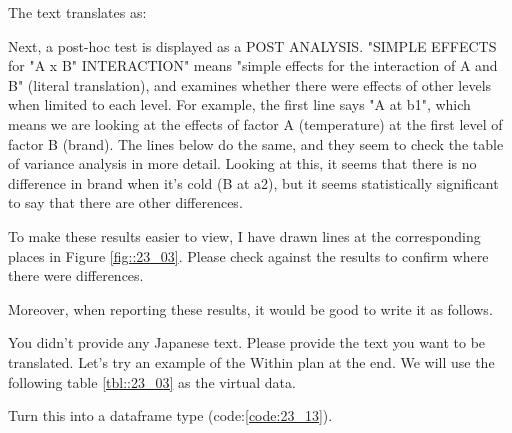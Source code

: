 \documentclass{ltjbook}
\begin{document}
The text translates as:

Next, a post-hoc test is displayed as a POST ANALYSIS. "SIMPLE EFFECTS for "A x B" INTERACTION" means "simple effects for the interaction of A and B" (literal translation), and examines whether there were effects of other levels when limited to each level. For example, the first line says "A at b1", which means we are looking at the effects of factor A (temperature) at the first level of factor B (brand). The lines below do the same, and they seem to check the table of variance analysis in more detail. Looking at this, it seems that there is no difference in brand when it's cold (B at a2), but it seems statistically significant to say that there are other differences.

To make these results easier to view, I have drawn lines at the corresponding places in Figure \ref{fig::23_03}. Please check against the results to confirm where there were differences.


Moreover, when reporting these results, it would be good to write it as follows.

You didn't provide any Japanese text. Please provide the text you want to be translated.
Let's try an example of the Within plan at the end. We will use the following table \ref{tbl::23_03} as the virtual data.


Turn this into a dataframe type (code:\ref{code:23_13}).

\end{document}
